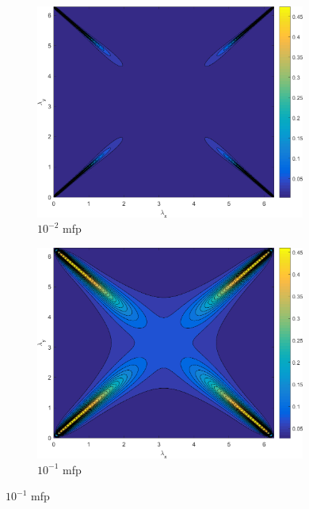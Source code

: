 \begin{figure}
\centering
	{
	\begin{subfigure}[b]{0.485\textwidth}
		\centering
		\includegraphics[width=0.975\textwidth]{figures/sec_DSA/SI_MIP_C=4_UPWLD1_LS2_x=1e-2_dydx=1_contour.png}
		\caption{$10^{-2}$ mfp}
	\end{subfigure}
	\hfill
	\begin{subfigure}[b]{0.485\textwidth}
		\centering
		\includegraphics[width=0.975\textwidth]{figures/sec_DSA/SI_MIP_C=4_UPWLD1_LS2_x=1e-1_dydx=1_contour.png}
		\caption{$10^{-1}$ mfp}
	\end{subfigure}
	}
	\vspace{0.5cm}

\end{figure}
